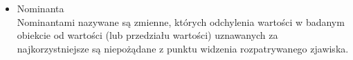 \documentclass[12pt,a4paper]{report}
\begin{document}
\begin{itemize}
\item Nominanta \cite[Rozdział 1.5]{panek2013}\\
Nominantami nazywane są zmienne, których odchylenia wartości w badanym obiekcie od wartości (lub przedziału wartości) uznawanych za najkorzystniejsze są niepożądane z punktu widzenia rozpatrywanego zjawiska.\\





\end{itemize}
\end{document}
